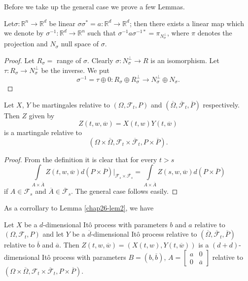 Before we take up the general case we prove a few Lemmas.

\setcounter{lemma}{0}
\begin{lemma}\label{chap26-lem1}
Let\pageoriginale $\sigma:\mathbb{R}^{n}\to \mathbb{R}^{d}$ be linear
$\sigma\sigma^{*}=a:\mathbb{R}^{d}\to \mathbb{R}^{d}$; then there
exists a linear map which we denote by $\sigma^{-1}:\mathbb{R}^{d}\to
\mathbb{R}^{n}$ such that
$\sigma^{-1}a\sigma^{-1*}=\pi_{N^{\perp}_{\sigma}}$, where $\pi$
denotes the projection and $N_{\sigma}$ null space of $\sigma$.
\end{lemma}

\begin{proof}
Let $R_{\sigma}=$ range of $\sigma$. Clearly
$\sigma:N^{\perp}_{\sigma}\to R$ is an isomorphism. Let
$\tau:R_{\sigma}\to N^{\perp}_{\sigma}$ be the inverse. We put
$$
\sigma^{-1}=\tau\oplus 0:R_{\sigma}\oplus R^{\perp}_{\sigma}\to
N^{\perp}_{\sigma}\oplus N_{\sigma}. 
$$
\end{proof}

\begin{lemma}\label{chap26-lem2}
Let $X$, $Y$ be martingales relative to $(\Omega,\mathscr{F}_{t},P)$
and $(\overline{\Omega},\overline{\mathscr{F}}_{t},\overline{P})$
respectively. Then $Z$ given by
$$
Z(t,w,\overline{w})=X(t,w)Y(t,\overline{w})
$$
is a martingale relative to
$$
(\Omega\times\overline{\Omega},\mathscr{F}_{t}\times
\overline{\mathscr{F}}_{t},P\times \overline{P}).
$$
\end{lemma}

\begin{proof}
From the definition it is clear that for every $t>s$
$$
\int\limits_{A\times \overline{A}}Z(t,w,\overline{w})d(P\times
\overline{P})|_{\mathscr{F}_{s}\times
  \overline{\mathscr{F}_{s}}}=\int\limits_{A\times\overline{A}}Z(s,w,\overline{w})d(P\times\overline{P}) 
$$
if $A\in \mathscr{F}_{s}$ and $\overline{A}\in
\overline{\mathscr{F}}_{s}$. The general case follows easily.
\end{proof}


As a corrollary to Lemma \ref{chap26-lem2}, we have

\begin{lemma}\label{chap26-lem3}
Let $X$ be a $d$-dimensional It\^o process with parameters $b$ and $a$
relative to $(\Omega,\mathscr{F}_{t},P)$ and let $Y$ be a
$\overline{d}$-dimensional It\^o process relative to
$(\overline{\Omega},\overline{\mathscr{F}}_{t},\overline{P})$ relative
to $\overline{b}$ and $\overline{a}$. Then
$Z(t,w,\overline{w})=(X(t,w),Y(t,\overline{w}))$ is a
$(d+d)$-dimensional It\^o process with parameters
$B=(b,\overline{b})$, $A=\left[\begin{smallmatrix} a & 0\\ 0 &
    \overline{a}\end{smallmatrix}\right]$ relative to $(\Omega\times
\overline{\Omega}, \mathscr{F}_{t}\times \overline{\mathscr{F}}_{t},P\times
\overline{P})$. 
\end{lemma}

